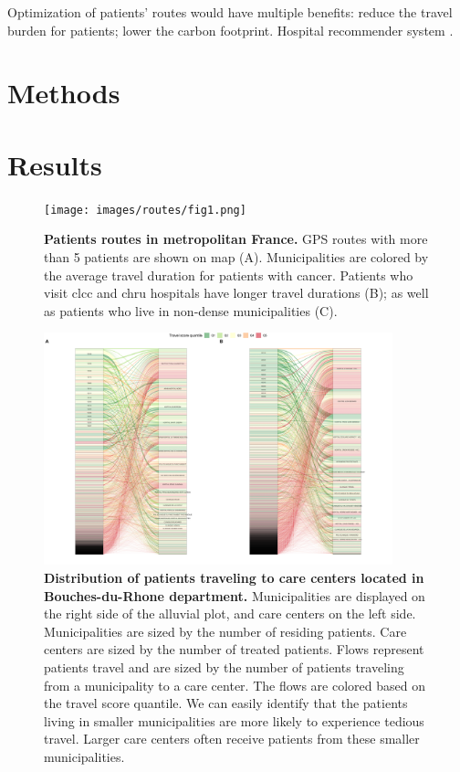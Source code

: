 Optimization of patients' routes would have multiple benefits: reduce the travel burden for patients; lower the carbon footprint.
Hospital recommender system \cite{zhang_idoctor_2017,han_hybrid_2018,narducci_recommender_2015,hoens_reliable_2010,tran_recommender_2021}.

\section{Methods}

\section{Results}

\begin{figure}[H]
    \texttt{[image: images/routes/fig1.png]}
    \centering
    \caption{
        \textbf{Patients routes in metropolitan France.} GPS routes with more than 5 patients are shown on map (A). Municipalities are colored by the average travel duration for patients with cancer. Patients who visit \ac{clcc} and \ac{chru} hospitals have longer travel durations (B); as well as patients who live in non-dense municipalities (C).
    }
    \label{fig:routes-duration-france}
\end{figure}

\begin{figure}[H]
    \includegraphics[width=0.9\textwidth]{images/routes/fig6.png}
    \centering
    \caption{
        \textbf{Distribution of patients traveling to care centers located in Bouches-du-Rhone department.} Municipalities are displayed on the right side of the alluvial plot, and care centers on the left side. Municipalities are sized by the number of residing patients. Care centers are sized by the number of treated patients. Flows represent patients travel and are sized by the number of patients traveling from a municipality to a care center. The flows are colored based on the travel score quantile. We can easily identify that the patients living in smaller municipalities are more likely to experience tedious travel. Larger care centers often receive patients from these smaller municipalities.
    }
    \label{fig:routes-alluvial-13}
\end{figure}

